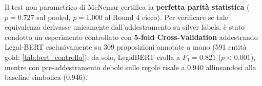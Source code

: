 \documentclass[12pt,a4paper,oneside]{report}
\begin{document}
\begin{table}[htbp]
  \centering
  \small
  \caption[Metriche comparative definitive dei sistemi NER e Test di McNemar]{Metriche comparative definitive strict dei sistemi NER e test di significatività appaiato di McNemar (Risposta a $\mathcal{D}_1$).}
  \label{tab:ner_mcnemar}
\end{table}

Il test non parametrico di McNemar certifica la \textbf{perfetta parità statistica} ($p=\num{0,727}$ sul pooled, $p=\num{1,000}$ al Round 4 cieco). Per verificare se tale equivalenza derivasse unicamente dall'addestramento su silver labels, è stato condotto un esperimento controllato con \textbf{5-fold Cross-Validation} addestrando Legal-BERT esclusivamente su 309 proposizioni annotate a mano (591 entità gold; \cref{tab:bert_controllo}): da solo, LegalBERT crolla a $F_1 = \num{0,821}$ ($p<\num{0,001}$), mentre con pre-addestramento debole sulle regole risale a \num{0,940} allineandosi alla baseline simbolica (\num{0,946}).
\end{document}
